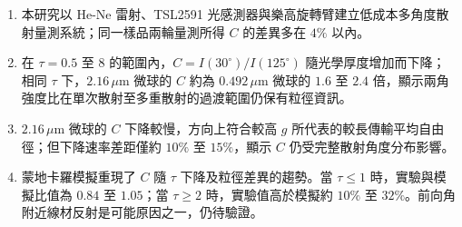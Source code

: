 \begin{enumerate}
    \item 本研究以 He-Ne 雷射、TSL2591 光感測器與樂高旋轉臂建立低成本多角度散射量測系統；同一樣品兩輪量測所得 $C$ 的差異多在 $4\%$ 以內。
    \item 在 $\tau=0.5$ 至 $8$ 的範圍內，$C=I(30^\circ)/I(125^\circ)$ 隨光學厚度增加而下降；相同 $\tau$ 下，$2.16\,\mu\mathrm{m}$ 微球的 $C$ 約為 $0.492\,\mu\mathrm{m}$ 微球的 $1.6$ 至 $2.4$ 倍，顯示兩角強度比在單次散射至多重散射的過渡範圍仍保有粒徑資訊。
    \item $2.16\,\mu\mathrm{m}$ 微球的 $C$ 下降較慢，方向上符合較高 $g$ 所代表的較長傳輸平均自由徑；但下降速率差距僅約 $10\%$ 至 $15\%$，顯示 $C$ 仍受完整散射角度分布影響。
    \item 蒙地卡羅模擬重現了 $C$ 隨 $\tau$ 下降及粒徑差異的趨勢。當 $\tau\leq1$ 時，實驗與模擬比值為 $0.84$ 至 $1.05$；當 $\tau\geq2$ 時，實驗值高於模擬約 $10\%$ 至 $32\%$。前向角附近線材反射是可能原因之一，仍待驗證。
\end{enumerate}
